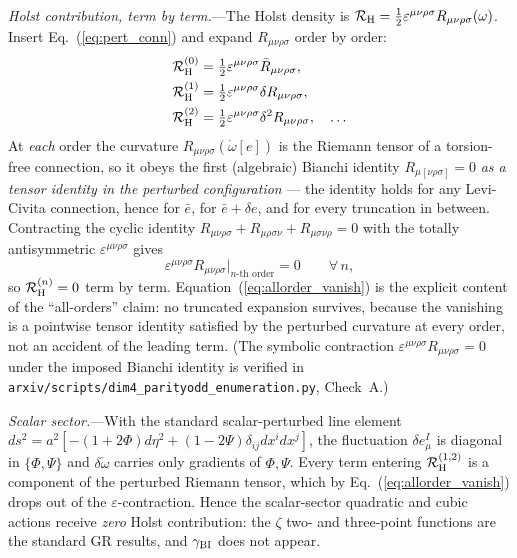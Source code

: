 \documentclass[aps,prd,twocolumn,superscriptaddress,showpacs,preprintnumbers,nofootinbib,longbibliography,floatfix]{revtex4-2}
\begin{document}
\textit{Holst contribution, term by term.}---The Holst density is
$\mathcal{R}_{\rm H}=\tfrac12\varepsilon^{\mu\nu\rho\sigma}
R_{\mu\nu\rho\sigma}(\omega)$. Insert Eq.~(\ref{eq:pert_conn}) and expand
$R_{\mu\nu\rho\sigma}$ order by order:
\begin{align}
\mathcal{R}_{\rm H}^{(0)}&=\tfrac12\varepsilon^{\mu\nu\rho\sigma}
\bar R_{\mu\nu\rho\sigma},\\
\mathcal{R}_{\rm H}^{(1)}&=\tfrac12\varepsilon^{\mu\nu\rho\sigma}
\delta R_{\mu\nu\rho\sigma},\\
\mathcal{R}_{\rm H}^{(2)}&=\tfrac12\varepsilon^{\mu\nu\rho\sigma}
\delta^2 R_{\mu\nu\rho\sigma},\quad\dots
\end{align}
At \emph{each} order the curvature $R_{\mu\nu\rho\sigma}(\mathring\omega[e])$
is the Riemann tensor of a torsion-free connection, so it obeys the first
(algebraic) Bianchi identity $R_{\mu[\nu\rho\sigma]}=0$ \emph{as a tensor
identity in the perturbed configuration} --- the identity holds for any
Levi-Civita connection, hence for $\bar e$, for $\bar e+\delta e$, and for
every truncation in between. Contracting the cyclic identity
$R_{\mu\nu\rho\sigma}+R_{\mu\rho\sigma\nu}+R_{\mu\sigma\nu\rho}=0$ with the
totally antisymmetric $\varepsilon^{\mu\nu\rho\sigma}$ gives
\begin{equation}
\varepsilon^{\mu\nu\rho\sigma}R_{\mu\nu\rho\sigma}\big|_{n\text{-th order}}=0
\qquad\forall\,n,
\label{eq:allorder_vanish}
\end{equation}
so $\mathcal{R}_{\rm H}^{(n)}=0$ term by term. Equation~(\ref{eq:allorder_vanish})
is the explicit content of the ``all-orders'' claim: no truncated expansion
survives, because the vanishing is a pointwise tensor identity satisfied by the
perturbed curvature at every order, not an accident of the leading term.
(The symbolic contraction $\varepsilon^{\mu\nu\rho\sigma}R_{\mu\nu\rho\sigma}=0$
under the imposed Bianchi identity is verified in
\texttt{arxiv/scripts/dim4\_parityodd\_enumeration.py}, Check~A.)

\textit{Scalar sector.}---With the standard scalar-perturbed line element
$ds^2=a^2[-(1+2\Phi)d\eta^2+(1-2\Psi)\delta_{ij}dx^idx^j]$, the fluctuation
$\delta e^I_\mu$ is diagonal in $\{\Phi,\Psi\}$ and $\delta\mathring\omega$
carries only gradients of $\Phi,\Psi$. Every term entering
$\mathcal{R}_{\rm H}^{(1,2)}$ is a component of the perturbed Riemann tensor,
which by Eq.~(\ref{eq:allorder_vanish}) drops out of the $\varepsilon$-contraction.
Hence the scalar-sector quadratic and cubic actions receive \emph{zero} Holst
contribution: the $\zeta$ two- and three-point functions are the standard GR
results, and $\gamma_{\rm BI}$ does not appear.
\end{document}
